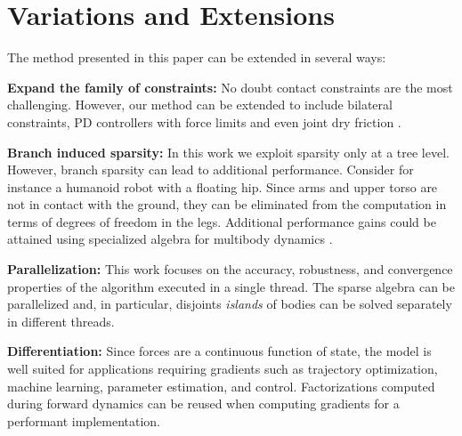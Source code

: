 \section{Variations and Extensions}
\label{sec:variations_and_extensions}

The method presented in this paper can be extended in several ways:

\textbf{Expand the family of constraints:} No doubt contact constraints are the
most challenging. However, our method can be extended to include bilateral
constraints, PD controllers with force limits and even joint dry friction
\cite{bib:todorov2014}.

\textbf{Branch induced sparsity:} In this work we exploit sparsity only at a
tree level. However, branch sparsity can lead to additional performance.
Consider for instance a humanoid robot with a floating hip. Since arms and upper
torso are not in contact with the ground, they can be eliminated from the
computation in terms of degrees of freedom in the legs. Additional performance
gains could be attained using specialized algebra for multibody dynamics
\cite{bib:carpentier2021}.

\textbf{Parallelization:} This work focuses on the accuracy, robustness, and
convergence properties of the algorithm executed in a single thread. The sparse
algebra can be parallelized and, in particular, disjoints \emph{islands} of
bodies can be solved separately in different threads.


\textbf{Differentiation:} Since forces are a continuous function of state, the
model is well suited for applications requiring gradients such as trajectory
optimization, machine learning, parameter estimation, and control.
Factorizations computed during forward dynamics can be reused when computing
gradients for a performant implementation.
